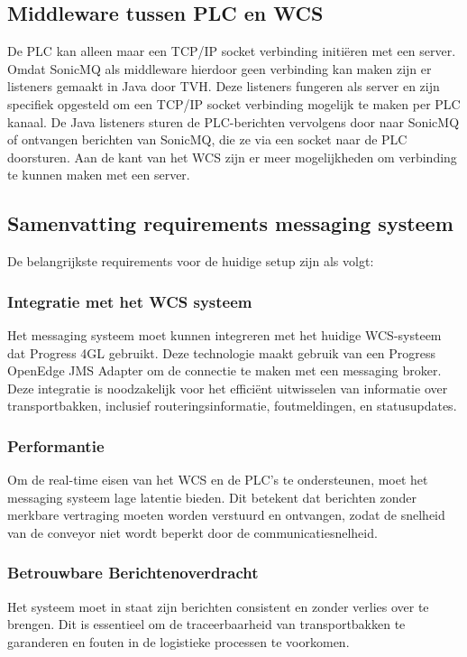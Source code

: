 \subsection{Middleware tussen PLC en WCS}
De PLC kan alleen maar een TCP/IP socket verbinding initiëren met een server.
Omdat SonicMQ als middleware hierdoor geen verbinding kan maken zijn er listeners gemaakt in Java door TVH.
Deze listeners fungeren als server en zijn specifiek opgesteld om een TCP/IP socket verbinding mogelijk te maken per PLC kanaal.
De Java listeners sturen de PLC-berichten vervolgens door naar SonicMQ of ontvangen berichten van SonicMQ, 
die ze via een socket naar de PLC doorsturen.
Aan de kant van het WCS zijn er meer mogelijkheden om verbinding te kunnen maken met een server.


\subsection{Samenvatting requirements messaging systeem}
De belangrijkste requirements voor de huidige setup zijn als volgt:

\subsubsection{Integratie met het WCS systeem}
Het messaging systeem moet kunnen integreren met het huidige WCS-systeem dat Progress 4GL gebruikt. 
Deze technologie maakt gebruik van een Progress OpenEdge JMS Adapter om de connectie te maken met een messaging broker.
Deze integratie is noodzakelijk voor het efficiënt uitwisselen van informatie over transportbakken, inclusief routeringsinformatie, 
foutmeldingen, en statusupdates.

\subsubsection{Performantie}
Om de real-time eisen van het WCS en de PLC’s te ondersteunen, moet het messaging systeem lage latentie bieden. 
Dit betekent dat berichten zonder merkbare vertraging moeten worden verstuurd en ontvangen, 
zodat de snelheid van de conveyor niet wordt beperkt door de communicatiesnelheid.

\subsubsection{Betrouwbare Berichtenoverdracht}
Het systeem moet in staat zijn berichten consistent en zonder verlies over te brengen. 
Dit is essentieel om de traceerbaarheid van transportbakken te garanderen en fouten in de logistieke processen te voorkomen.

